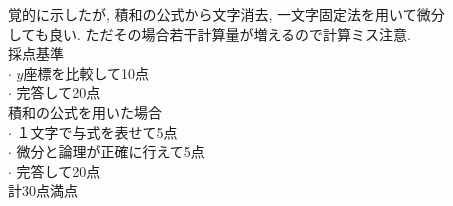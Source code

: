 \documentclass{article}
\begin{document}
\hspace{0.62in}覚的に示したが, 積和の公式から文字消去, 一文字固定法を用いて微分\\
\hspace{0.62in}しても良い. ただその場合若干計算量が増えるので計算ミス注意. \vspace{0.2in}\\
 {\Large 採点基準}\vspace{0.1in}\\
 $\cdot$ $y$座標を比較して10点\vspace{0.1in}\\
 $\cdot$ 完答して20点\vspace{0.1in}\\
積和の公式を用いた場合\vspace{0.1in}\\ 
$\cdot$ １文字で与式を表せて5点\vspace{0.1in}\\
$\cdot$ 微分と論理が正確に行えて5点\vspace{0.1in}\\
$\cdot$ 完答して20点\vspace{0.1in}\\
計30点満点 
 
\end{document}

